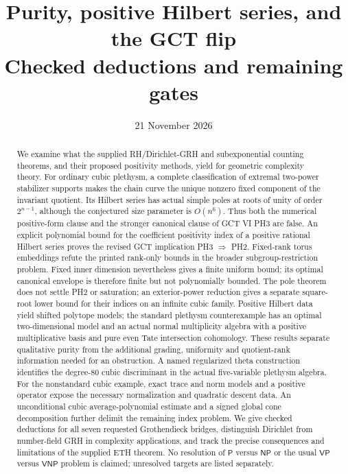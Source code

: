 \documentclass[11pt,a4paper]{article}
\title{Purity, positive Hilbert series, and the GCT flip\\[5pt]\large Checked deductions and remaining gates}
\author{}
\date{21 November 2026}
\begin{document}
\maketitle
\begin{abstract}
We examine what the supplied RH/Dirichlet-GRH and subexponential counting
theorems, and their proposed positivity methods, yield for geometric
complexity theory. For ordinary cubic plethysm, a complete classification
of extremal two-power stabilizer supports makes the chain curve the unique
nonzero fixed component of the invariant quotient. Its Hilbert series
has actual simple poles at roots of unity of order $2^{n-1}$,
although the conjectured size
parameter is $O(n^6)$. Thus both the numerical positive-form clause and
the stronger canonical clause of GCT VI PH3 are false. An explicit
polynomial bound for the coefficient
positivity index of a positive rational Hilbert series proves the revised
GCT implication PH3 $\Rightarrow$ PH2. Fixed-rank torus embeddings refute
the printed rank-only bounds in the broader subgroup-restriction problem.
Fixed inner dimension nevertheless gives a finite uniform bound; its
optimal canonical envelope is therefore finite but not polynomially
bounded. The pole theorem does not settle PH2 or saturation; an
exterior-power reduction gives a separate square-root lower bound for
their indices on an infinite cubic family. Positive Hilbert data yield shifted polytope models; the
standard plethysm counterexample has an optimal two-dimensional model
and an actual normal multiplicity algebra with a positive multiplicative
basis and pure even Tate intersection cohomology. These results separate qualitative purity
from the additional grading, uniformity and quotient-rank information
needed for an obstruction. A named regularized theta construction
identifies the degree-$80$ cubic discriminant in the actual five-variable
plethysm algebra. For the nonstandard cubic example, exact trace and norm
models and a positive operator expose the necessary normalization and
quadratic descent data. An unconditional cubic average-polynomial estimate
and a signed global cone decomposition further delimit the remaining
index problem. We give checked deductions for all seven
requested Grothendieck bridges, distinguish Dirichlet from number-field
GRH in complexity applications, and track the precise consequences and
limitations of the supplied ETH theorem. No resolution of $\mathsf P$
versus $\mathsf{NP}$ or the usual $\mathsf{VP}$ versus $\mathsf{VNP}$
problem is claimed; unresolved targets are listed separately.
\end{abstract}
{\small\setlength{\parskip}{0pt}\tableofcontents}
\clearpage
\end{document}
